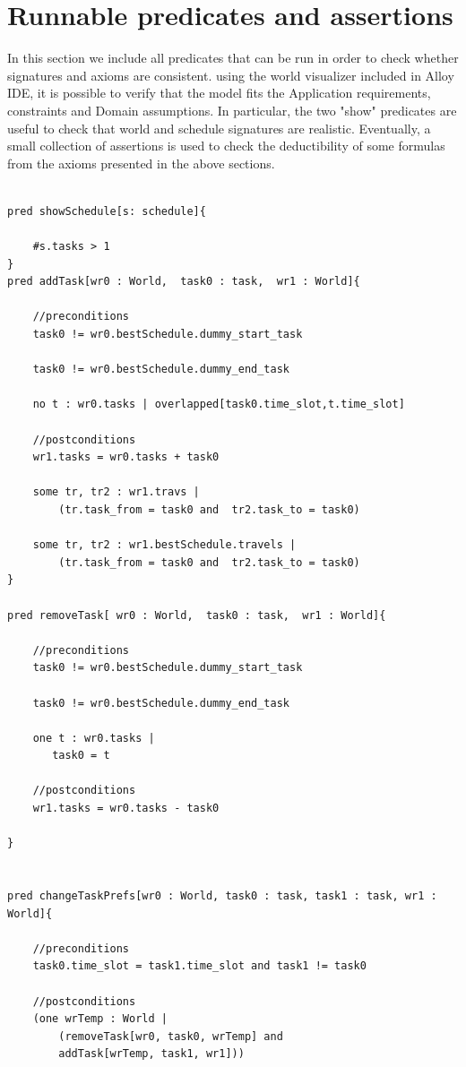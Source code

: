 \section{Runnable predicates and assertions}
In this section we include all predicates that can be run in order to check whether signatures and axioms are consistent. using the world visualizer included in Alloy IDE, it is possible to verify that the model fits the Application requirements, constraints and Domain assumptions. In particular, the two "show" predicates are useful to check that world and schedule signatures are realistic. Eventually, a small collection of assertions is used to check the deductibility of some formulas from the axioms presented in the above sections.
\\
\\
\begin{verbatim}
pred showSchedule[s: schedule]{

	#s.tasks > 1
}
pred addTask[wr0 : World,  task0 : task,  wr1 : World]{

    //preconditions
    task0 != wr0.bestSchedule.dummy_start_task 
    
    task0 != wr0.bestSchedule.dummy_end_task
    
    no t : wr0.tasks | overlapped[task0.time_slot,t.time_slot]

    //postconditions
    wr1.tasks = wr0.tasks + task0
    
    some tr, tr2 : wr1.travs |
        (tr.task_from = task0 and  tr2.task_to = task0)
    
    some tr, tr2 : wr1.bestSchedule.travels |
        (tr.task_from = task0 and  tr2.task_to = task0) 
}

pred removeTask[ wr0 : World,  task0 : task,  wr1 : World]{

    //preconditions
    task0 != wr0.bestSchedule.dummy_start_task 
    
    task0 != wr0.bestSchedule.dummy_end_task
    
    one t : wr0.tasks |
	   task0 = t
	   
    //postconditions
    wr1.tasks = wr0.tasks - task0  

}


pred changeTaskPrefs[wr0 : World, task0 : task, task1 : task, wr1 : World]{

    //preconditions
    task0.time_slot = task1.time_slot and task1 != task0
    
    //postconditions
    (one wrTemp : World | 
        (removeTask[wr0, task0, wrTemp] and 
        addTask[wrTemp, task1, wr1]))  


\end{verbatim}
